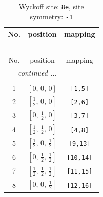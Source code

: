 \documentclass[fleqn,8pt]{jsarticle}
\begin{document}
\renewcommand{\arraystretch}{1.2}
\begin{longtable}{ccc}
\caption{Wyckoff site: {\tt 8e}, site symmetry: {\tt -1}}
 \\
 \hline \hline
No. & position & mapping \\ \hline \endfirsthead

\multicolumn{2}{l}{\tablename\ \thetable{}} \\
 \hline \hline
No. & position & mapping \\ \hline \endhead

 \hline \hline
\multicolumn{2}{r}{\footnotesize\it continued ...} \\ \endfoot

 \hline \hline
\multicolumn{2}{r}{} \\ \endlastfoot

1 & $\left[ 0,\, 0,\, 0 \right]$ & {\tt [1,5]} \\ \hline
2 & $\left[ \frac{1}{2},\, 0,\, 0 \right]$ & {\tt [2,6]} \\ \hline
3 & $\left[ 0,\, \frac{1}{2},\, 0 \right]$ & {\tt [3,7]} \\ \hline
4 & $\left[ \frac{1}{2},\, \frac{1}{2},\, 0 \right]$ & {\tt [4,8]} \\ \hline
5 & $\left[ \frac{1}{2},\, 0,\, \frac{1}{2} \right]$ & {\tt [9,13]} \\ \hline
6 & $\left[ 0,\, \frac{1}{2},\, \frac{1}{2} \right]$ & {\tt [10,14]} \\ \hline
7 & $\left[ \frac{1}{2},\, \frac{1}{2},\, \frac{1}{2} \right]$ & {\tt [11,15]} \\ \hline
8 & $\left[ 0,\, 0,\, \frac{1}{2} \right]$ & {\tt [12,16]} \\
\end{longtable}
\renewcommand{\arraystretch}{1.2}
\end{document}
